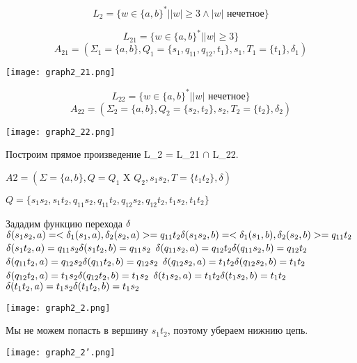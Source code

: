 \documentclass[a4paper, 12pt]{article}
\begin{document}
\subsection{}
$$L_2 = \{ w \in \{a,b\}^* | |w| \geq 3 \land |w| \text{ нечетное} \}$$

$$L_{21} = \{ w \in \{a,b\}^* | |w| \geq 3 \}$$
$$A_{21} = (\Sigma_1 = \{a, b\}, Q_1 = \{s_1, q_{11}, q_{12}, t_1\}, s_1, T_1 = \{t_1\}, \delta_1)$$
\begin{center}
    \texttt{[image: graph2\_21.png]}
\end{center}

$$L_{22} = \{ w \in \{a,b\}^* | |w| \text{ нечетное} \}$$
$$A_{22} = (\Sigma_2 = \{a, b\}, Q_2 = \{s_2, t_2\}, s_2, T_2 = \{t_2\}, \delta_2)$$
\begin{center}
    \texttt{[image: graph2\_22.png]}
\end{center}
Построим прямое произведение L_2 = L_{21} $\cap$ L_{22}.

$A2 = (\Sigma = \{a, b\}, Q = Q_1 \text{ X } Q_2, s_1s_2, T = \{t_1t_2\}, \delta)$

$Q = \{s_1s_2, s_1t_2, q_{11}s_2, q_{11}t_2, q_{12}s_2, q_{12}t_2, t_1s_2, t_1t_2\}$

Зададим функцию перехода $\delta\\$
\nointend
$\delta(s_1s_2, a) = <\delta_1(s_1, a), \delta_2(s_2, a)> = q_{11}t_2 \hfill \delta(s_1s_2, b) = <\delta_1(s_1, b), \delta_2(s_2, b)> = q_{11}t_2\\$
$\delta(s_1t_2, a) =  q_{11}s_2\hfill \delta(s_1t_2, b) = q_{11}s_2\\$
$\delta(q_{11}s_2, a) =  q_{12}t_2\hfill \delta(q_{11}s_2, b) = q_{12}t_2\\$
$\delta(q_{11}t_2, a) =  q_{12}s_2\hfill \delta(q_{11}t_2, b) = q_{12}s_2\\$
$\delta(q_{12}s_2, a) =  t_1t_2\hfill \delta(q_{12}s_2, b) = t_1t_2\\$
$\delta(q_{12}t_2, a) =  t_1s_2\hfill \delta(q_{12}t_2, b) = t_1s_2\\$
$\delta(t_1s_2, a) =  t_1t_2\hfill \delta(t_1s_2, b) = t_1t_2\\$
$\delta(t_1t_2, a) =  t_1s_2\hfill \delta(t_1t_2, b) = t_1s_2\\$

\begin{center}
    \texttt{[image: graph2\_2.png]}
\end{center}
Мы не можем попасть в вершину $s_1t_2$, поэтому убераем нижнию цепь.
\begin{center}
    \texttt{[image: graph2\_2'.png]}
\end{center}
\end{document}
